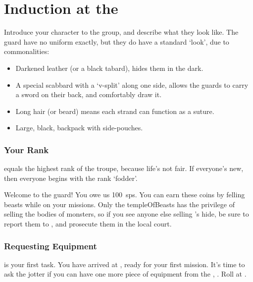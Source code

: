 \section[Induction at the \Glsfmttext{templeOfBeasts}]{Induction at the }
\label{ngIntroductions}

\begin{multicols}{2}

\noindent
Introduce your character to the group, and describe what they look like.
The \gls{guard} have no uniform exactly, but they do have a standard `look', due to commonalities:

\begin{itemize}
  \item
  Darkened leather (or a black tabard), hides them in the dark.
  \item
  A special scabbard with a `v-split' along one side, allows the \glspl{guard} to carry a sword on their back, and comfortably draw it.
  \item
  Long hair (or beard) means each strand can function as a suture.
  \item
  Large, black, backpack with side-pouches.
\end{itemize}

\subsubsection{Your Rank}
\label{ngRank}
equals the highest rank of the troupe, because life's not fair.
If everyone's new, then everyone begins with the rank `\gls{fodder}'.

Welcome to the \gls{guard}!
You owe us 100~\glspl{sp}.
You can earn these coins by felling beasts while on your missions.
Only the \gls{templeOfBeasts} has the privilege of selling the bodies of \glspl{monster}, so if you see anyone else selling 's hide, be sure to report them to , and prosecute them in the local \gls{court}.

\subsubsection{Requesting Equipment}
is your first task.
You have arrived at , ready for your first mission.
It's time to ask the \gls{jotter} if you can have one more piece of equipment from the , .
Roll  at \tn[7].


\end{multicols}
